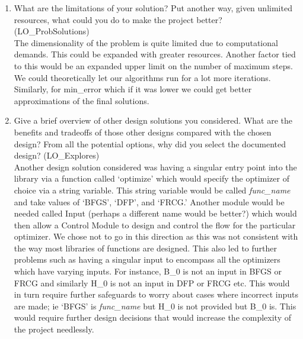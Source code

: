 \documentclass[12pt, titlepage]{article}
\begin{document}
\begin{enumerate}
  \item What are the limitations of your solution?  Put another way, given
  unlimited resources, what could you do to make the project better?
  (LO\_ProbSolutions)
  \\

  The dimensionality of the problem is quite limited due to computational demands. This could be expanded with greater resources. Another factor tied to this would be an expanded upper limit on the number of maximum steps. We could theoretically let our algorithms run for a lot more iterations. Similarly, for min\_error which if it was lower we could get better approximations of the final solutions.
    
  \item Give a brief overview of other design solutions you considered.  What
  are the benefits and tradeoffs of those other designs compared with the chosen
  design?  From all the potential options, why did you select the documented design?
  (LO\_Explores)
  \\

  Another design solution considered was having a singular entry point into the library via a function called `optimize' which would specify the optimizer of choice via a string variable. This string variable would be called \textit{func\_name} and take values of `BFGS', `DFP', and `FRCG.' Another module would be needed called Input (perhaps a different name would be better?) which would then allow a Control Module to design and control the flow for the particular optimizer. We chose not to go in this direction as this was not consistent with the way most libraries of functions are designed. This also led to further problems such as having a singular input to encompass all the optimizers which have varying inputs. For instance, B\_0 is not an input in BFGS or FRCG and similarly H\_0 is not an input in DFP or FRCG etc. This would in turn require further safeguards to worry about cases where incorrect inputs are made; ie `BFGS' is \textit{func\_name} but H\_0 is not provided but B\_0 is. This would require further design decisions that would increase the complexity of the project needlessly. 
\end{enumerate}
\end{document}
